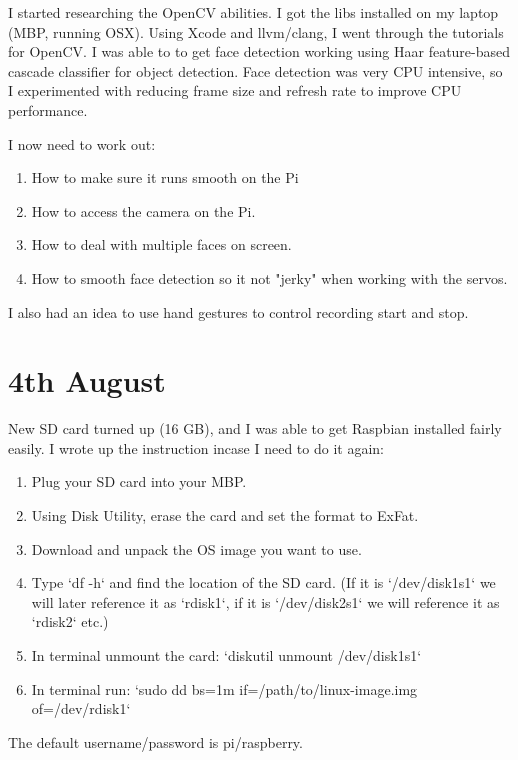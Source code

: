 I started researching the OpenCV abilities. I got the libs installed on my laptop (MBP, running OSX). Using Xcode and llvm/clang, I went through the tutorials for OpenCV. I was able to to get face detection working using Haar feature-based cascade classifier for object detection. Face detection was very CPU intensive, so I experimented with reducing frame size and refresh rate to improve CPU performance.

I now need to work out:

\begin{enumerate}
  \item How to make sure it runs smooth on the Pi
  \item How to access the camera on the Pi.
  \item How to deal with multiple faces on screen.
  \item How to smooth face detection so it not "jerky" when working with the servos.
\end{enumerate}

I also had an idea to use hand gestures to control recording start and stop.



\section*{4th August}

New SD card turned up (16 GB), and I was able to get Raspbian installed fairly easily. I wrote up the instruction incase I need to do it again:

\begin{enumerate}

\item Plug your SD card into your MBP.
\item Using Disk Utility, erase the card and set the format to ExFat.
\item Download and unpack the OS image you want to use.
\item Type `df -h` and find the location of the SD card. (If it is `/dev/disk1s1` we will later reference it as `rdisk1`, if it is `/dev/disk2s1` we will reference it as `rdisk2` etc.)
\item In terminal unmount the card: `diskutil unmount /dev/disk1s1`
\item In terminal run: `sudo dd bs=1m if=/path/to/linux-image.img of=/dev/rdisk1`
\end{enumerate}

The default username/password is pi/raspberry.

